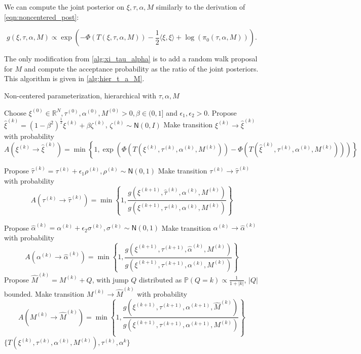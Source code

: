 \documentclass{siamart1116}
\begin{document}
        We can compute the joint posterior on $\xi, \tau, \alpha, M$ similarly to the derivation of \cref{eqn:noncentered_post}:

        \begin{equation}
        \label{eqn:noncentered_post_M}
        g(\xi,\tau,\alpha, M) \propto \exp\left( -\Phi(T(\xi,\tau,\alpha,M))-\frac{1}{2}\langle \xi,\xi \rangle + \log(\pi_0(\tau,\alpha,M)) \right).
        \end{equation}

        The only modification from \cref{alg:xi_tau_alpha} is to add a random walk proposal for $M$ and compute the acceptance probability as the ratio of the joint posteriors. This algorithm is given in \cref{alg:hier_t_a_M}.

        \begin{algorithm}

        \caption{Non-centered parameterization, hierarchical with $\tau, \alpha, M$}
        \label{alg:hier_t_a_M}
        \begin{algorithmic}
        \State Choose $\xi^{(0)} \in \mathbb{R}^N, \tau^{(0)}, \alpha^{(0)}, M^{(0)} > 0, \beta \in (0, 1]$ and $\epsilon_1, \epsilon_2 > 0$.
        \State Propose $\hat\xi^{(k)} = (1-\beta^2)^{\frac{1}{2}}\xi^{(k)} + \beta \zeta^{(k)}$, $\zeta^{(k)} \sim \mathsf{N}(0, I)$
        \State Make transition $\xi^{(k)} \to \hat\xi^{(k)}$ with probability
        \[ A(\xi^{(k)} \to \hat\xi^{(k)}) = \min\left\{1, \exp\left(\Phi(T(\xi^{(k)},\tau^{(k)},\alpha^{(k)}, M^{(k)})) - \Phi(T(\hat\xi^{(k)},\tau^{(k)},\alpha^{(k)}, M^{(k)}))\right) \right\}\] 

        \State Propose $\hat\tau^{(k)} = \tau^{(k)} + \epsilon_1 \rho^{(k)}, \rho^{(k)} \sim \mathsf{N}(0,1)$
        \State Make transition $\tau^{(k)} \to \hat\tau^{(k)}$ with probability
        \[ A(\tau^{(k)} \to \hat\tau^{(k)}) 
        = \min\left\{1, \frac{g(\xi^{(k+1)},\hat\tau^{(k)},\alpha^{(k)},M^{(k)})}{g(\xi^{(k+1)},\tau^{(k)},\alpha^{(k)},M^{(k)})} \right\}\] 

        \State Propose $\hat\alpha^{(k)} = \alpha^{(k)} + \epsilon_2 \sigma^{(k)}, \sigma^{(k)} \sim \mathsf{N}(0,1)$
        \State Make transition $\alpha^{(k)} \to \hat\alpha^{(k)}$ with probability
        \[ A(\alpha^{(k)} \to \hat\alpha^{(k)}) 
        = \min\left\{1, \frac{g(\xi^{(k+1)},\tau^{(k+1)},\hat \alpha^{(k)},M^{(k)})}{g(\xi^{(k+1)},\tau^{(k+1)},\alpha^{(k)},M^{(k)})} \right\}\]
        \State Propose $\hat M^{(k)} = M^{(k)} + Q$, with jump $Q$ distributed as $\mathbb{P}(Q=k) \propto \frac{1}{1+|k|}$, $|Q|$ bounded.
        \State Make transition $M^{(k)} \to \hat M^{(k)}$ with probability
        \[ A(M^{(k)} \to \hat M^{(k)}) = 
        \min\left\{1, \frac{g(\xi^{(k+1)},\tau^{(k+1)},\alpha^{(k+1)},\hat M^{(k)})}{g(\xi^{(k+1)},\tau^{(k+1)},\alpha^{(k+1)},M^{(k)})} \right\}
        \]
        \EndFor
        \State \Return $\{ T(\xi^{(k)},\tau^{(k)},\alpha^{(k)}, M^{(k)}), \tau^{(k)}, \alpha^{k} \}$
        \end{algorithmic}
        \end{algorithm}
\end{document}
